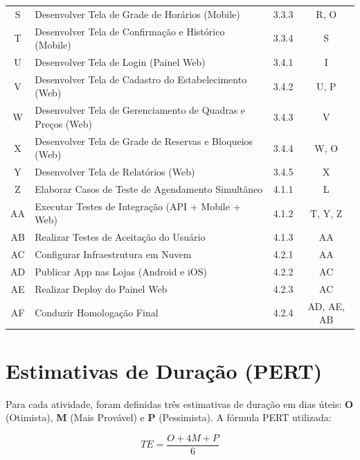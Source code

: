 \documentclass[12pt,a4paper,oneside]{report}
\begin{document}
\begin{longtable}{c p{6cm} c c}
S & Desenvolver Tela de Grade de Horários (Mobile) & 3.3.3 & R, O \\
T & Desenvolver Tela de Confirmação e Histórico (Mobile) & 3.3.4 & S \\
U & Desenvolver Tela de Login (Painel Web) & 3.4.1 & I \\
V & Desenvolver Tela de Cadastro do Estabelecimento (Web) & 3.4.2 & U, P \\
W & Desenvolver Tela de Gerenciamento de Quadras e Preços (Web) & 3.4.3 & V \\
X & Desenvolver Tela de Grade de Reservas e Bloqueios (Web) & 3.4.4 & W, O \\
Y & Desenvolver Tela de Relatórios (Web) & 3.4.5 & X \\
Z & Elaborar Casos de Teste de Agendamento Simultâneo & 4.1.1 & L \\
AA & Executar Testes de Integração (API + Mobile + Web) & 4.1.2 & T, Y, Z \\
AB & Realizar Testes de Aceitação do Usuário & 4.1.3 & AA \\
AC & Configurar Infraestrutura em Nuvem & 4.2.1 & AA \\
AD & Publicar App nas Lojas (Android e iOS) & 4.2.2 & AC \\
AE & Realizar Deploy do Painel Web & 4.2.3 & AC \\
AF & Conduzir Homologação Final & 4.2.4 & AD, AE, AB \\
\end{longtable}

\section{Estimativas de Duração (PERT)}

Para cada atividade, foram definidas três estimativas de duração em dias úteis: \textbf{O} (Otimista), \textbf{M} (Mais Provável) e \textbf{P} (Pessimista). A fórmula PERT utilizada:

\begin{equation}
TE = \frac{O + 4M + P}{6}
\end{equation}
\end{document}
